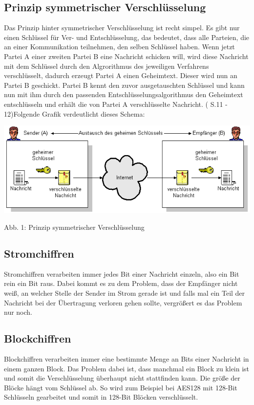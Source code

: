 \documentclass[a4paper,12pt,titlepage]{article}
\begin{document}
\subsection{Prinzip symmetrischer Verschlüsselung}
Das Prinzip hinter symmetrischer Verschlüsselung ist recht simpel. Es gibt nur einen Schlüssel für Ver- und Entschlüsselung, das bedeutet, dass alle Parteien, die an einer Kommunikation teilnehmen, den selben Schlüssel haben. Wenn jetzt Partei A einer zweiten Partei B eine Nachricht schicken will, wird diese Nachricht mit dem Schlüssel durch den Algrorithmus des jeweiligen Verfahrens verschlüsselt, dadurch erzeugt Partei A einen Geheimtext. Dieser wird nun an Partei B geschickt. Partei B kennt den zuvor ausgetauschten Schlüssel und kann nun mit ihm durch den passenden Entschlüsselungsalgorithmus den Geheimtext entschlüsseln und erhält die von Partei A verschlüsselte Nachricht. (\cite{delfs_knebl} S.11 - 12)\newline Folgende Grafik verdeutlicht dieses Schema:
\begin{center}
\includegraphics[scale=0.7]{symm_shema.png} %
\end{center}
Abb. 1: Prinzip symmetrischer Verschlüsselung

\subsection{Stromchiffren}
Stromchiffren verarbeiten immer jedes Bit einer Nachricht einzeln, also ein Bit rein ein Bit raus. Dabei kommt es zu dem Problem, dass der Empfänger nicht weiß, an welcher Stelle der Sender im Strom gerade ist und falls mal ein Teil der Nachricht bei der Übertragung verloren gehen sollte, vergrößert es das Problem nur noch.

\subsection{Blockchiffren}
Blockchiffren verarbeiten immer eine bestimmte Menge an Bits einer Nachricht in einem ganzen Block. Das Problem dabei ist, dass manchmal ein Block zu klein ist und somit die Verschlüsselung überhaupt nicht stattfinden kann. Die größe der Blöcke hängt vom Schlüssel ab. So wird zum Beispiel bei AES128 mit 128-Bit Schlüsseln gearbeitet und somit in 128-Bit Blöcken verschlüsselt.
\end{document}
